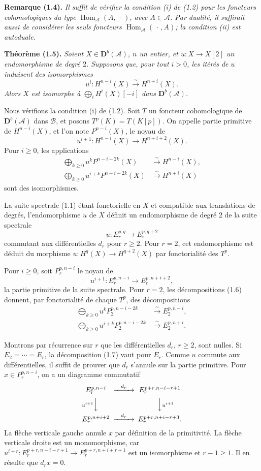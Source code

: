 \documentclass[11pt]{article}
\DeclareMathOperator{\Hom}{Hom}
\newcommand{\bD}{\mathbf D}
\newcommand{\cA}{\mathcal A}
\newcommand{\cB}{\mathcal B}
\newenvironment{named}[1]{\par\medskip\noindent\textbf{#1}\itshape}{\par\medskip}
\begin{document}
\begin{named}{Remarque (1.4).}
Il suffit de vérifier la condition (i) de (1.2) pour les foncteurs cohomologiques du type $\Hom_\cA(A,\,\cdot\,)$, avec $A\in\cA$. Par dualité, il suffirait aussi de considérer les seuls foncteurs $\Hom_\cA(\,\cdot\,,A)$; la condition (ii) est autoduale.
\end{named}

\begin{named}{Théorème (1.5).}
Soient $X\in\bD^b(\cA)$, $n$ un entier, et $u:X\to X[2]$ un endomorphisme de degré $2$. Supposons que, pour tout $i>0$, les itérés de $u$ induisent des isomorphismes
\[
u^i:H^{n-i}(X)\xrightarrow{\sim}H^{n+i}(X).
\]
Alors $X$ est isomorphe à $\bigoplus_i H^i(X)[-i]$ dans $\bD^b(\cA)$.
\end{named}
Nous vérifions la condition (i) de (1.2). Soit $T$ un foncteur cohomologique de $\bD^b(\cA)$ dans $\cB$, et posons $T^p(K)=T(K[p])$. On appelle partie primitive de $H^{n-i}(X)$, et l'on note $P^{n-i}(X)$, le noyau de
\[
u^{i+1}:H^{n-i}(X)\longrightarrow H^{n+i+2}(X).
\]
Pour $i\ge0$, les applications
\begin{align}\tag{1.6}
\bigoplus_{k\ge0}u^k P^{n-i-2k}(X)&\xrightarrow{\sim}H^{n-i}(X),\\
\bigoplus_{k\ge0}u^{i+k} P^{n-i-2k}(X)&\xrightarrow{\sim}H^{n+i}(X)
\end{align}
sont des isomorphismes.

La suite spectrale (1.1) étant fonctorielle en $X$ et compatible aux translations de degrés, l'endomorphisme $u$ de $X$ définit un endomorphisme de degré $2$ de la suite spectrale
\[
u:E_r^{p,q}\longrightarrow E_r^{p,q+2}
\]
commutant aux différentielles $d_r$ pour $r\ge2$. Pour $r=2$, cet endomorphisme est déduit du morphisme $u:H^q(X)\to H^{q+2}(X)$ par fonctorialité des $T^p$.

Pour $i\ge0$, soit $P_r^{p,n-i}$ le noyau de
\[
u^{i+1}:E_r^{p,n-i}\longrightarrow E_r^{p,n+i+2},
\]
la partie primitive de la suite spectrale. Pour $r=2$, les décompositions (1.6) donnent, par fonctorialité de chaque $T^p$, des décompositions
\begin{align}\tag{1.7}
\bigoplus_{k\ge0}u^k P_2^{p,n-i-2k}&\xrightarrow{\sim}E_2^{p,n-i},\\
\bigoplus_{k\ge0}u^{i+k} P_2^{p,n-i-2k}&\xrightarrow{\sim}E_2^{p,n+i}.
\end{align}

Montrons par récurrence sur $r$ que les différentielles $d_r$, $r\ge2$, sont nulles. Si $E_2=\cdots=E_r$, la décomposition (1.7) vaut pour $E_r$. Comme $u$ commute aux différentielles, il suffit de prouver que $d_r$ s'annule sur la partie primitive. Pour $x\in P_r^{p,n-i}$, on a un diagramme commutatif
\[
\begin{CD}
E_r^{p,n-i} @>{d_r}>> E_r^{p+r,n-i-r+1}\\
@V{u^{i+1}}VV @VV{u^{i+1}}V\\
E_r^{p,n+i+2} @>{d_r}>> E_r^{p+r,n+i-r+3}.
\end{CD}
\]
La flèche verticale gauche annule $x$ par définition de la primitivité. La flèche verticale droite est un monomorphisme, car $u^{i+r}:E_r^{p+r,n-i-r+1}\to E_r^{p+r,n+i+r+1}$ est un isomorphisme et $r-1\ge1$. Il en résulte que $d_r x=0$.
\end{document}
